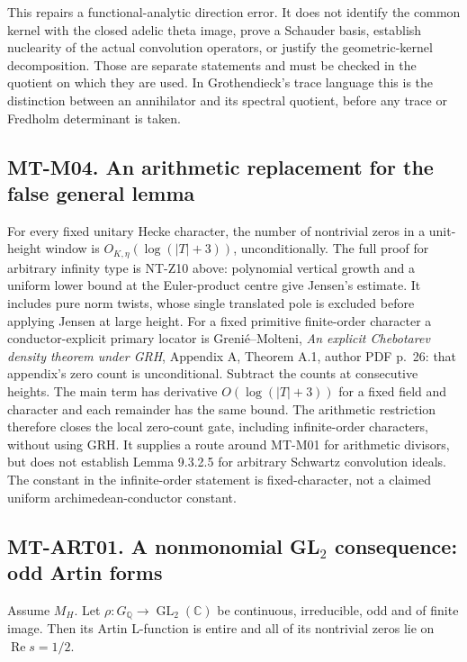 \documentclass[11pt,a4paper]{article}
\begin{document}
This repairs a functional-analytic direction error.  It does not identify
the common kernel with the closed adelic theta image, prove a Schauder
basis, establish nuclearity of the actual convolution operators, or justify
the geometric-kernel decomposition.  Those are separate statements and
must be checked in the quotient on which they are used.  In Grothendieck's
trace language this is the distinction between an annihilator and its
spectral quotient, before any trace or Fredholm determinant is taken.

\subsection*{MT-M04. An arithmetic replacement for the false general lemma}
For every fixed unitary Hecke character, the number of nontrivial zeros
in a unit-height window is $O_{K,\eta}(\log(|T|+3))$, unconditionally.
The full proof for arbitrary infinity type is NT-Z10 above: polynomial
vertical growth and a uniform lower bound at the Euler-product centre
give Jensen's estimate.  It includes pure norm twists, whose single
translated pole is excluded before applying Jensen at large height.
For a fixed primitive finite-order character a conductor-explicit
primary locator is Greni\'e--Molteni,
\emph{An explicit Chebotarev density theorem under GRH}, Appendix A,
Theorem A.1, author PDF p.~26: that appendix's zero count is unconditional.
Subtract the counts at consecutive heights.  The main term has derivative
$O(\log(|T|+3))$ for a fixed field and character and each remainder has the
same bound.  The arithmetic restriction therefore closes the local
zero-count gate, including infinite-order characters, without using GRH.
It supplies a route around MT-M01 for arithmetic divisors, but does not
establish Lemma 9.3.2.5 for arbitrary Schwartz convolution ideals.  The
constant in the infinite-order statement is fixed-character, not a
claimed uniform archimedean-conductor constant.

\subsection*{MT-ART01. A nonmonomial GL\texorpdfstring{$_2$}{2} consequence: odd Artin forms}
Assume $M_H$.  Let $\rho:G_{\mathbb Q}\to\operatorname{GL}_2(\mathbb C)$
be continuous, irreducible, odd and of finite image.  Then its Artin
L-function is entire and all of its nontrivial zeros lie on
$\operatorname{Re}s=1/2$.
\end{document}

